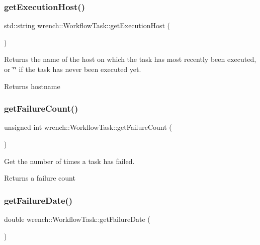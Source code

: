 \subsubsection{\texorpdfstring{get\+Execution\+Host()}{getExecutionHost()}}
{\footnotesize\ttfamily std\+::string wrench\+::\+Workflow\+Task\+::get\+Execution\+Host (\begin{DoxyParamCaption}{ }\end{DoxyParamCaption})}



Returns the name of the host on which the task has most recently been executed, or \char`\"{}\char`\"{} if the task has never been executed yet. 

\begin{DoxyReturn}{Returns}
hostname 
\end{DoxyReturn}
\mbox{\label{classwrench_1_1_workflow_task_a6103d36486855fb8caabb008bcfaacd4}} 
\subsubsection{\texorpdfstring{get\+Failure\+Count()}{getFailureCount()}}
{\footnotesize\ttfamily unsigned int wrench\+::\+Workflow\+Task\+::get\+Failure\+Count (\begin{DoxyParamCaption}{ }\end{DoxyParamCaption})}



Get the number of times a task has failed. 

\begin{DoxyReturn}{Returns}
a failure count 
\end{DoxyReturn}
\mbox{\label{classwrench_1_1_workflow_task_ae96176bb8e0695833b0e4b6034b36857}} 
\subsubsection{\texorpdfstring{get\+Failure\+Date()}{getFailureDate()}}
{\footnotesize\ttfamily double wrench\+::\+Workflow\+Task\+::get\+Failure\+Date (\begin{DoxyParamCaption}{ }\end{DoxyParamCaption})}



